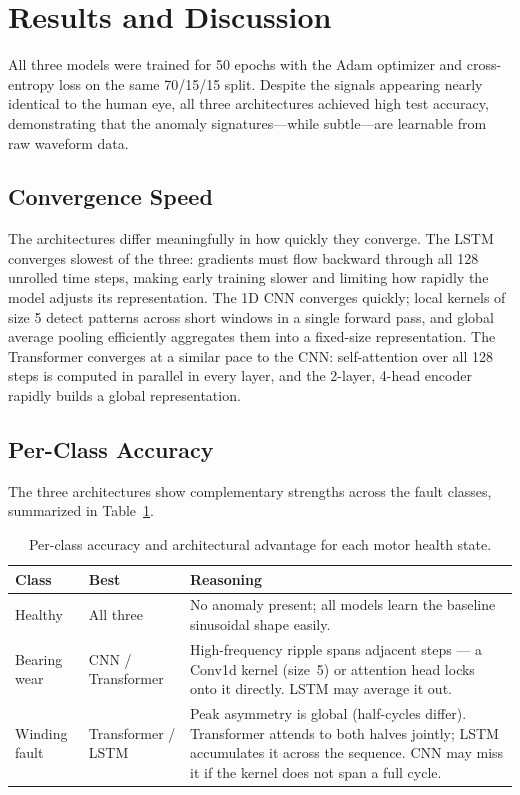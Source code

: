 \documentclass[10pt,twocolumn]{article}
\begin{document}
\section{Results and Discussion}
\label{sec:results}

All three models were trained for 50 epochs with the Adam optimizer and cross-entropy loss on the same 70/15/15 split. Despite the signals appearing nearly identical to the human eye, all three architectures achieved high test accuracy, demonstrating that the anomaly signatures—while subtle—are learnable from raw waveform data.

\subsection{Convergence Speed}

The architectures differ meaningfully in how quickly they converge. The LSTM converges slowest of the three: gradients must flow backward through all 128 unrolled time steps, making early training slower and limiting how rapidly the model adjusts its representation. The 1D CNN converges quickly; local kernels of size 5 detect patterns across short windows in a single forward pass, and global average pooling efficiently aggregates them into a fixed-size representation. The Transformer converges at a similar pace to the CNN: self-attention over all 128 steps is computed in parallel in every layer, and the 2-layer, 4-head encoder rapidly builds a global representation.

\subsection{Per-Class Accuracy}

The three architectures show complementary strengths across the fault classes, summarized in Table~\ref{tab:per_class}.

\begin{table}[htb]
\centering
\begin{tabular}{@{}p{1.4cm}p{1.6cm}p{4.2cm}@{}}
\hline
\textbf{Class} & \textbf{Best} & \textbf{Reasoning} \\
\hline
Healthy & All three & No anomaly present; all models learn the baseline sinusoidal shape easily. \\[3pt]
Bearing wear & CNN / Transformer & High-frequency ripple spans adjacent steps — a Conv1d kernel (size~5) or attention head locks onto it directly. LSTM may average it out. \\[3pt]
Winding fault & Transformer / LSTM & Peak asymmetry is global (half-cycles differ). Transformer attends to both halves jointly; LSTM accumulates it across the sequence. CNN may miss it if the kernel does not span a full cycle. \\
\hline
\end{tabular}
\caption{Per-class accuracy and architectural advantage for each motor health state.}
\label{tab:per_class}
\end{table}
\end{document}
